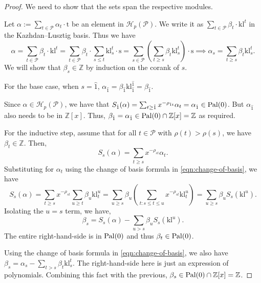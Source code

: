 \documentclass[12pt,letterpaper,english]{amsart}
\theoremstyle{teoremas}
\theoremstyle{definition}
\newcommand{\cH}{\mathcal{H}}
\newcommand{\calP}{\mathcal{P}}
\newcommand{\ZZ}{\mathbb{Z}}
\newcommand{\Ebasis}[1]{\mathrm{#1}}
\newcommand{\klbasis}[1]{\mathrm{kl}^{#1}}
\newcommand{\klbasisSub}[2]{\mathrm{kl}^{#1}_{#2}}
\newcommand{\pal}{\normalfont\text{Pal}}
\begin{document}
\begin{proof}
    We need to show that the sets span the respective modules.

    Let \(\alpha:=\sum_{t\in\calP}{\alpha_t\cdot\Ebasis{t}}\) be an element in \(\cH_p(\calP)\).
    We write it as
    \(\sum_{t\in\calP}{\beta_t\cdot\klbasis{t}}\) in the Kazhdan--Lusztig basis.
    Thus we have
    \begin{equation}\label{eqn:change-of-basis}
        \alpha = \sum_{t\in\calP}{\beta_t\cdot\klbasis{t}}
        =\sum_{t\in\calP}{\beta_t\cdot\sum_{s\leq t}{\klbasisSub{t}{s}\cdot\Ebasis{s}}}
        =\sum_{s\in\calP}{\left(\sum_{t\geq s}{\beta_{t}\klbasisSub{t}{s}}\right)\cdot\Ebasis{s}}
        \implies\alpha_{s}=\sum_{t\geq s}{\beta_{t}\klbasisSub{t}{s}}.
    \end{equation}
    We will show that \(\beta_s\in\ZZ\) by induction on the corank of \(s\).

    \noindent For the base case, when \(s=\hat{1}\),
    \(\alpha_{\hat{1}}=\beta_{\hat{1}}\klbasisSub{\hat{1}}
    {\hat{1}}=\beta_{\hat{1}}\).

    Since \(\alpha\in\cH_p(\calP)\),
    we have that \(S_{\hat{1}}(\alpha) = \sum_{t\geq \hat{1}}
    {x^{-\rho_{\hat{1}t}}\alpha_{t} = \alpha_{\hat{1}}}\in\pal(0)\). But \(\alpha_{\hat{1}}\)
    also needs to be in \(\ZZ[x]\). Thus, \(\beta_{\hat{1}}=\alpha_{\hat{1}}\in\pal(0)\cap\ZZ[x] = \ZZ\)
    as required.

    \noindent For the inductive step, assume that for all \(t\in\calP\) with \(\rho(t)>\rho(s)\),
    we have \(\beta_t\in\ZZ\). Then,
    \[S_s(\alpha)=\sum_{t\geq s}{x^{-\rho_{st}}\alpha_{t}}.\]
    Substituting for \(\alpha_t\) using the change of basis formula in \ref{eqn:change-of-basis},
    we have
    \[S_s(\alpha)=\sum_{t\geq s}{x^{-\rho_{st}}\sum_{u\geq t}{\beta_{u}\klbasisSub{u}{t}}}
        =\sum_{u\geq s}{\beta_{u}\left(\sum_{t:s\leq t\leq u}{x^{-\rho_{st}}\klbasisSub{u}{t}}\right)}
        =\sum_{u\geq s}{\beta_{u}S_s(\klbasis{u})}.\]
    Isolating the \(u=s\) term, we have,
    \[\beta_{s} = S_s(\alpha) - \sum_{u> s}{\beta_{u}S_s(\klbasis{u})}.\]
    The entire right-hand-side is in \(\pal(0)\) and thus \(\beta_{t}\in\pal(0)\).


    \noindent Using the change of basis formula in \ref{eqn:change-of-basis}, we also have
    \(\beta_{s}=\alpha_s-\sum_{t>s}{\beta_{t}\klbasisSub{t}{s}}.\)
    The right-hand-side here is just an expression of polynomials. Combining this fact with the previous,
    \(\beta_s\in\pal(0)\cap\ZZ[x]=\ZZ\).


\end{proof}
\end{document}
